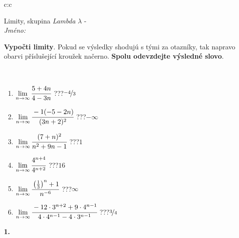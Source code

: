 \documentclass[10pt]{report}
\begin{document}
\begin{tabular}{c:c}
\begin{minipage}[c][104.5mm][t]{0.5\linewidth}
\begin{center}
\vspace{7mm}
{\huge Limity, skupina \textit{Lambda $\lambda$} -}\\[5mm]
\textit{Jméno:}\phantom{xxxxxxxxxxxxxxxxxxxxxxxxxxxxxxxxxxxxxxxxxxxxxxxxxxxxxxxxxxxxxxxxx}\\[5mm]
\begin{minipage}{0.95\linewidth}
\begin{center}
\textbf{Vypočti limity}. Pokud se výsledky shodujú s tými za otazníky, tak napravo\\obarvi příslušející kroužek načerno. \textbf{Spolu odevzdejte výsledné slovo}.
\end{center}
\end{minipage}
\\[1mm]
\begin{minipage}{0.79\linewidth}
\begin{center}
\begin{varwidth}{\linewidth}
\begin{enumerate}
\normalsize
\item $\lim\limits_{n\to\infty}\cfrac{5+4n}{4-3n}$\quad \dotfill\; ???\;\dotfill \quad $\nicefrac{-4}{3}$
\item $\lim\limits_{n\to\infty}\cfrac{-1(-5-2n)}{(3n+2)^2}$\quad \dotfill\; ???\;\dotfill \quad $-\infty$
\item $\lim\limits_{n\to\infty}\cfrac{(7+n)^2}{n^2+9n-1}$\quad \dotfill\; ???\;\dotfill \quad $1$
\item $\lim\limits_{n\to\infty}\cfrac{4^{n+4}}{4^{n+2}}$\quad \dotfill\; ???\;\dotfill \quad $16$
\item $\lim\limits_{n\to\infty}\cfrac{\left(\frac{1}{3}\right)^n +1}{n^{-6}}$\quad \dotfill\; ???\;\dotfill \quad $\infty$
\item $\lim\limits_{n\to\infty}\cfrac{-12\cdot 3^{n+2}+9\cdot 4^{n-1}}{4\cdot 4^{n-1}-4\cdot 3^{n-1}}$\quad \dotfill\; ???\;\dotfill \quad $\nicefrac{3}{4}$
\end{enumerate}
\end{varwidth}
\end{center}
\end{minipage}
\begin{minipage}{0.20\linewidth}
\begin{center}
{\Huge\bfseries 1.} \\[2mm]

\end{center}
\end{minipage}
\end{center}
\end{minipage}
\end{tabular}
\end{document}
